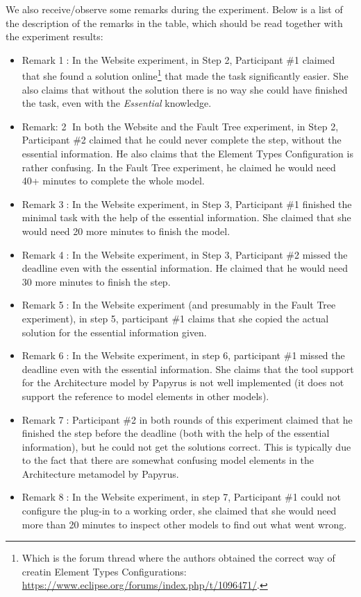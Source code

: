 We also receive/observe some remarks during the experiment.
Below is a list of the description of the remarks in the table, which should be read together with the experiment results:
\begin{itemize}
	\item Remark \textcircled{1}: In the Website experiment, in Step 2, Participant \#1 claimed that she found a solution online\footnote{Which is the forum thread where the authors obtained the correct way of creatin Element Types Configurations: \url{https://www.eclipse.org/forums/index.php/t/1096471/}.} that made the task significantly easier. 
	She also claims that without the solution there is no way she could have finished the task, even with the \textit{Essential} knowledge.
	\item Remark: \textcircled{2} In both the Website and the Fault Tree experiment, in Step 2, Participant \#2 claimed that he could never complete the step, without the essential information. 
	He also claims that the Element Types Configuration is rather confusing.
	In the Fault Tree experiment, he claimed he would need 40+ minutes to complete the whole model.
	\item Remark \textcircled{3}: In the Website experiment, in Step 3, Participant  \#1 finished the minimal task with the help of the essential information. She	claimed that she would need 20 more minutes to finish the model.
	\item Remark \textcircled{4}: In the Website experiment, in Step 3, Participant  \#2 missed the deadline even with the essential information.
	He claimed that he would need 30 more minutes to finish the step.
	\item Remark \textcircled{5}: In the Website experiment (and presumably in the Fault Tree experiment), in step 5, participant  \#1 claims that she copied the actual solution for the essential information given.
	\item Remark \textcircled{6}: In the Website experiment, in step 6, participant  \#1 missed the deadline even with the essential information. 
	She claims that the tool support for the Architecture model by Papyrus is not well implemented (it does not support the reference to model elements in other models).
	\item Remark \textcircled{7}: Participant  \#2 in both rounds of this experiment claimed that he finished the step before the deadline (both with the help of the essential information), but he could not get the solutions correct. 
	This is typically due to the fact that there are somewhat confusing model elements in the Architecture metamodel by Papyrus.
	\item Remark \textcircled{8}: In the Website experiment, in step 7, Participant  \#1 could not configure the plug-in to a working order, she claimed that she would need more than 20 minutes to inspect other models to find out what went wrong.
\end{itemize}

